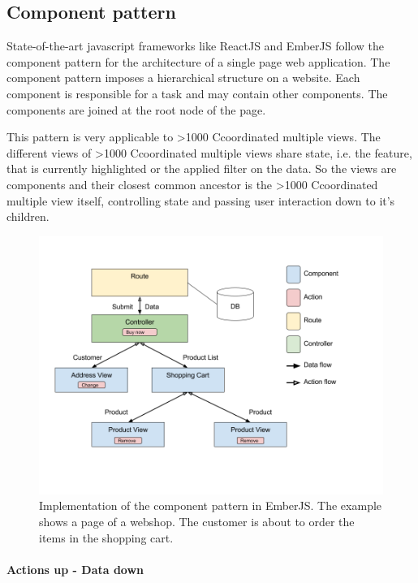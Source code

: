 \documentclass{article}
\newcommand\hmm[1]{\ifnum\ifhmode\spacefactor\else2000\fi>1000 \uppercase{#1}\else#1\fi}
\newcommand{\cmv}{\hmm{c}oordinated multiple view}
\newcommand{\cmvs}{\hmm{c}oordinated multiple views}
\begin{document}

\subsection{Component pattern}
State-of-the-art javascript frameworks like ReactJS and EmberJS follow the component pattern for the architecture of a single page web application.
The component pattern imposes a hierarchical structure on a website.
Each component is responsible for a task and may contain other components.
The components are joined at the root node of the page.

This pattern is very applicable to \cmvs{}.
The different views of \cmvs{} share state, i.e. the feature, that is currently highlighted or the applied filter on the data.
So the views are components and their closest common ancestor is the \cmv{} itself, controlling state and passing user interaction down to it's children.

\begin{figure}[h!]
  \centering
  \includegraphics[width=\textwidth]{images/data-down-actions-up.png}
  \caption{Implementation of the component pattern in EmberJS.
  The example shows a page of a webshop.
  The customer is about to order the items in the shopping cart.}
  \label{fig:implementation:frontend-frameworks}
\end{figure}

\paragraph{Actions up - Data down}
\end{document}
